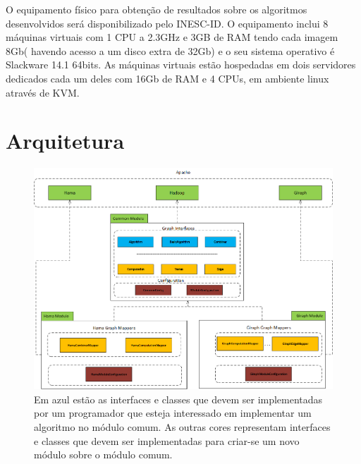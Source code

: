 O equipamento físico para obtenção de resultados sobre os algoritmos desenvolvidos será disponibilizado pelo INESC-ID. 
O equipamento inclui 8 máquinas virtuais com 1 CPU a 2.3GHz e 3GB de RAM tendo cada imagem 8Gb( havendo acesso a um disco extra de 32Gb) e o seu sistema operativo é Slackware 14.1 64bits.
As máquinas virtuais estão hospedadas em dois servidores dedicados cada um deles com 16Gb de RAM e 4 CPUs, em ambiente linux através de KVM.

\section{Arquitetura}
\begin{figure}
	\centering
		\includegraphics[width=\linewidth]{arquitetura}
	\caption{Em azul estão as interfaces e classes que devem ser implementadas por um programador que esteja interessado em implementar um algoritmo no módulo comum. As outras cores representam interfaces e classes que devem ser implementadas para criar-se um novo módulo sobre o módulo comum.}
	\label{fig:arquitetura}
\end{figure}
